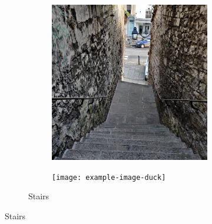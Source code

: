 \begin{figure}[!hbtp]
\begin{subfigure}[b]{\textwidth}
\begin{subfigure}[b]{0.32\textwidth}
             \includegraphics[width=\textwidth]{content/3-Methods/enviroments/stair_2_modified.jpg}
        \end{subfigure}
        \hfill
        \begin{subfigure}[b]{0.32\textwidth}
             \centering
             \texttt{[image: example-image-duck]}
        \end{subfigure}
        \caption{Stairs}
        \label{fig:methods-stair-example}
      \end{subfigure}
      \newline
      

\end{figure}
